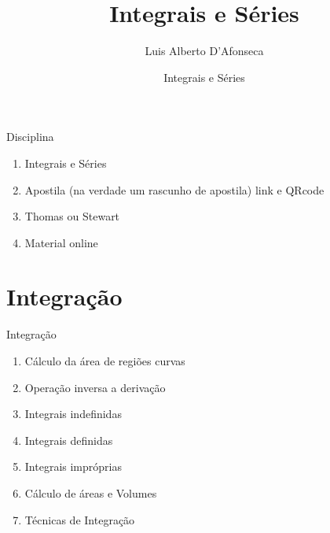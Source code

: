 
\usepackage{apresentacao}
\usepackage{tabto}

\makeatletter
\graphicspath  {{./figs/}}
\makeatother

\title   {Integrais e Séries}
\author  {\large Luis Alberto D'Afonseca}
\date    {Integrais e Séries}



\begin{frame}
    \titlepage
\end{frame}

\begin{frame}{Disciplina}
  \begin{enumerate}[<+->]
    \item Integrais e Séries
    \item Apostila (na verdade um rascunho de apostila) link e QRcode
    \item Thomas ou Stewart
    \item Material online
  \end{enumerate}
\end{frame}

\section{Integração}

\begin{frame}{Integração}
  \begin{enumerate}[<+->]
    \item Cálculo da área de regiões curvas
    \item Operação inversa a derivação
    \item Integrais indefinidas
    \item Integrais definidas
    \item Integrais impróprias
    \item Cálculo de áreas e Volumes
    \item Técnicas de Integração
  \end{enumerate}
\end{frame}


